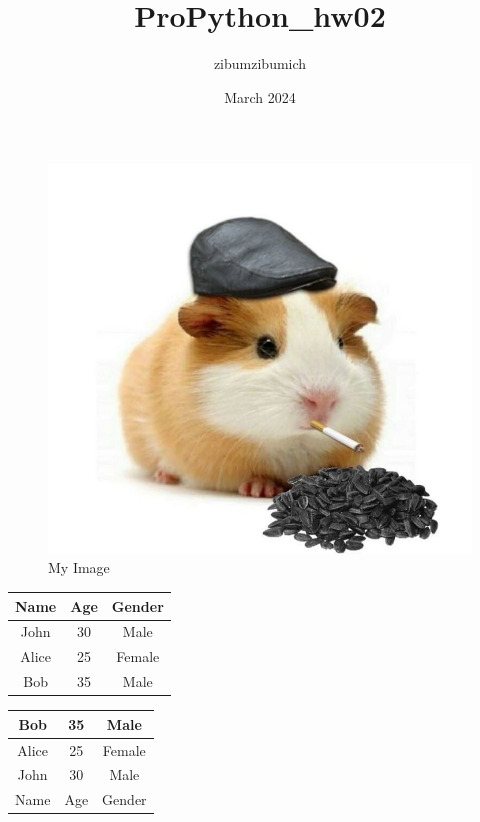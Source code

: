 \documentclass{article}
\title{ProPython_hw02}
\author{zibumzibumich }
\date{March 2024}
\begin{document}
\maketitle

    \begin{figure}[h!]
    \centering
    \includegraphics{artifacts/image.png}
    \caption{My Image}
    \label{fig:my_image}
    \end{figure}
    

\begin{tabular}{|c|c|c|}
\hline
Name & Age & Gender \\
\hline
John & 30 & Male \\
\hline
Alice & 25 & Female \\
\hline
Bob & 35 & Male \\
\hline\end{tabular}

\begin{tabular}{|c|c|c|}
\hline
Bob & 35 & Male \\
\hline
Alice & 25 & Female \\
\hline
John & 30 & Male \\
\hline
Name & Age & Gender \\
\hline\end{tabular}
\end{document}
